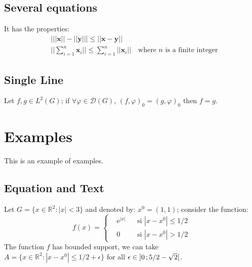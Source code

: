 \documentclass[11pt,fleqn,,a4paper,twoside,openright]{book} %
\begin{document}
\subsection{Several equations}

\begin{proposition}
It has the properties:
\begin{align}
& \big| ||\mathbf{x}|| - ||\mathbf{y}|| \big|\leq || \mathbf{x}- \mathbf{y}||\\
&  ||\sum_{i=1}^n\mathbf{x}_i||\leq \sum_{i=1}^n||\mathbf{x}_i||\quad\text{where $n$ is a finite integer}
\end{align}
\end{proposition}

\subsection{Single Line}

\begin{proposition} 
Let $f,g\in L^2(G)$; if $\forall \varphi\in\mathcal{D}(G)$, $(f,\varphi)_0=(g,\varphi)_0$ then $f = g$. 
\end{proposition}


\section{Examples}

This is an example of examples.

\subsection{Equation and Text}

\begin{example}
Let $G=\{x\in\mathbb{R}^2:|x|<3\}$ and denoted by: $x^0=(1,1)$; consider the function:
\begin{equation}
f(x)=\left\{\begin{aligned} & \mathrm{e}^{|x|} & & \text{si $|x-x^0|\leq 1/2$}\\
& 0 & & \text{si $|x-x^0|> 1/2$}\end{aligned}\right.
\end{equation}
The function $f$ has bounded support, we can take $A=\{x\in\mathbb{R}^2:|x-x^0|\leq 1/2+\epsilon\}$ for all $\epsilon\in\intoo{0}{5/2-\sqrt{2}}$.
\end{example}
\end{document}

